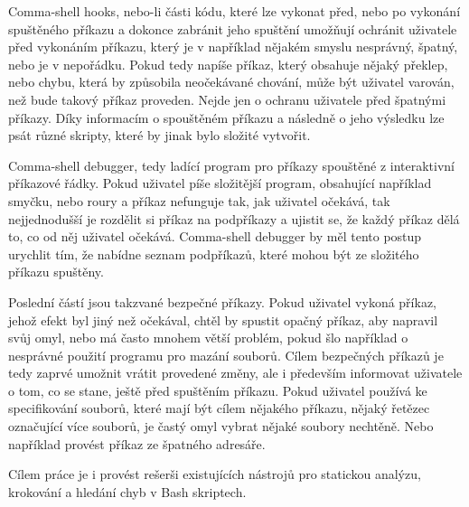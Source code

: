 \documentclass[thesis=M,czech]{FITthesis}[2012/06/26]
\begin{document}
\begin{introduction}
Comma-shell hooks, nebo-li části kódu, které lze vykonat před, nebo po vykonání spuštěného příkazu a dokonce zabránit jeho spuštění umožňují ochránit uživatele před vykonáním příkazu, který je v například nějakém smyslu nesprávný, špatný, nebo je v nepořádku. Pokud tedy napíše příkaz, který obsahuje nějaký překlep, nebo chybu, která by způsobila neočekávané chování, může být uživatel varován, než bude takový příkaz proveden. Nejde jen o ochranu uživatele před špatnými příkazy. Díky informacím o spouštěném příkazu a následně o jeho výsledku lze psát různé skripty, které by jinak bylo složité vytvořit.

Comma-shell debugger, tedy ladící program pro příkazy spouštěné z interaktivní příkazové řádky. Pokud uživatel píše složitější program, obsahující například smyčku, nebo roury a příkaz nefunguje tak, jak uživatel očekává, tak nejjednodušší je rozdělit si příkaz na podpříkazy a ujistit se, že každý příkaz dělá to, co od něj uživatel očekává. Comma-shell debugger by měl tento postup urychlit tím, že nabídne seznam podpříkazů, které mohou být ze složitého příkazu spuštěny.

Poslední částí jsou takzvané bezpečné příkazy. Pokud uživatel vykoná příkaz, jehož efekt byl jiný než očekával, chtěl by spustit opačný příkaz, aby napravil svůj omyl, nebo má často mnohem větší problém, pokud šlo například o nesprávné použití programu pro mazání souborů. Cílem bezpečných příkazů je tedy zaprvé umožnit vrátit provedené změny, ale i především informovat uživatele o tom, co se stane, ještě před spuštěním příkazu. Pokud uživatel používá ke specifikování souborů, které mají být cílem nějakého příkazu, nějaký řetězec označující více souborů, je častý omyl vybrat nějaké soubory nechtěně. Nebo například provést příkaz ze špatného adresáře.

Cílem práce je i provést rešerši existujících nástrojů pro statickou analýzu, krokování a hledání chyb v Bash skriptech.




\end{introduction}
\end{document}
